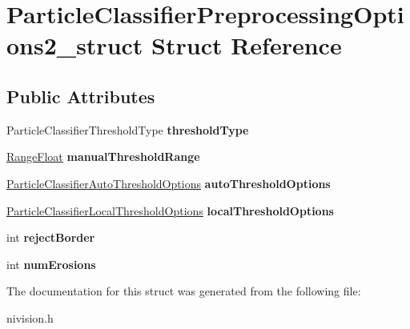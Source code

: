 \hypertarget{structParticleClassifierPreprocessingOptions2__struct}{
\section{ParticleClassifierPreprocessingOptions2\_\-struct Struct Reference}
\label{structParticleClassifierPreprocessingOptions2__struct}
}
\subsection*{Public Attributes}
\begin{DoxyCompactItemize}
\item 
\hypertarget{structParticleClassifierPreprocessingOptions2__struct_a7b9af754e53dd6705201eeb1692729b1}{
ParticleClassifierThresholdType {\bfseries thresholdType}}
\label{structParticleClassifierPreprocessingOptions2__struct_a7b9af754e53dd6705201eeb1692729b1}

\item 
\hypertarget{structParticleClassifierPreprocessingOptions2__struct_abb78868925d8abbcc5fabe1d1b97d1de}{
\hyperlink{structRangeFloat__struct}{RangeFloat} {\bfseries manualThresholdRange}}
\label{structParticleClassifierPreprocessingOptions2__struct_abb78868925d8abbcc5fabe1d1b97d1de}

\item 
\hypertarget{structParticleClassifierPreprocessingOptions2__struct_adbbcff2bd950a9ce0ba365f04001f41b}{
\hyperlink{structParticleClassifierAutoThresholdOptions__struct}{ParticleClassifierAutoThresholdOptions} {\bfseries autoThresholdOptions}}
\label{structParticleClassifierPreprocessingOptions2__struct_adbbcff2bd950a9ce0ba365f04001f41b}

\item 
\hypertarget{structParticleClassifierPreprocessingOptions2__struct_a3a637399a59f835dac970413063b8298}{
\hyperlink{structParticleClassifierLocalThresholdOptions__struct}{ParticleClassifierLocalThresholdOptions} {\bfseries localThresholdOptions}}
\label{structParticleClassifierPreprocessingOptions2__struct_a3a637399a59f835dac970413063b8298}

\item 
\hypertarget{structParticleClassifierPreprocessingOptions2__struct_a6fa2751f1083516a1e218594e7dd8e78}{
int {\bfseries rejectBorder}}
\label{structParticleClassifierPreprocessingOptions2__struct_a6fa2751f1083516a1e218594e7dd8e78}

\item 
\hypertarget{structParticleClassifierPreprocessingOptions2__struct_acca7fdcaf2d64d4ce1c77bd67e53d945}{
int {\bfseries numErosions}}
\label{structParticleClassifierPreprocessingOptions2__struct_acca7fdcaf2d64d4ce1c77bd67e53d945}

\end{DoxyCompactItemize}


The documentation for this struct was generated from the following file:\begin{DoxyCompactItemize}
\item 
nivision.h\end{DoxyCompactItemize}
